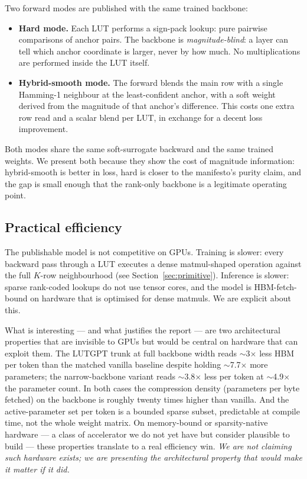 \documentclass[11pt]{article}
\begin{document}
Two forward modes are published with the same trained backbone:
\begin{itemize}[leftmargin=*,topsep=2pt,itemsep=1pt]
\item \textbf{Hard mode.} Each LUT performs a sign-pack lookup: pure pairwise comparisons of anchor pairs. The backbone is \emph{magnitude-blind}: a layer can tell which anchor coordinate is larger, never by how much. No multiplications are performed inside the LUT itself.
\item \textbf{Hybrid-smooth mode.} The forward blends the main row with a single Hamming-1 neighbour at the least-confident anchor, with a soft weight derived from the magnitude of that anchor's difference. This costs one extra row read and a scalar blend per LUT, in exchange for a decent loss improvement.
\end{itemize}
Both modes share the same soft-surrogate backward and the same trained weights. We present both because they show the cost of magnitude information: hybrid-smooth is better in loss, hard is closer to the manifesto's purity claim, and the gap is small enough that the rank-only backbone is a legitimate operating point.

\subsection{Practical efficiency}

The publishable model is not competitive on GPUs. Training is slower: every backward pass through a LUT executes a dense matmul-shaped operation against the full $K$-row neighbourhood (see Section~\ref{sec:primitive}). Inference is slower: sparse rank-coded lookups do not use tensor cores, and the model is HBM-fetch-bound on hardware that is optimised for dense matmuls. We are explicit about this.

What is interesting --- and what justifies the report --- are two architectural properties that are invisible to GPUs but would be central on hardware that can exploit them. The LUTGPT trunk at full backbone width reads $\sim$3$\times$ less HBM per token than the matched vanilla baseline despite holding $\sim$7.7$\times$ more parameters; the narrow-backbone variant reads $\sim$3.8$\times$ less per token at $\sim$4.9$\times$ the parameter count. In both cases the compression density (parameters per byte fetched) on the backbone is roughly twenty times higher than vanilla. And the active-parameter set per token is a bounded sparse subset, predictable at compile time, not the whole weight matrix. On memory-bound or sparsity-native hardware --- a class of accelerator we do not yet have but consider plausible to build --- these properties translate to a real efficiency win. \emph{We are not claiming such hardware exists; we are presenting the architectural property that would make it matter if it did.}
\end{document}
